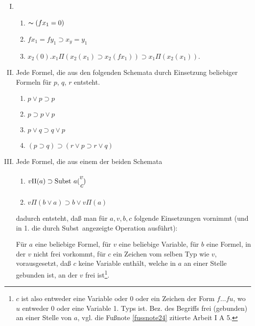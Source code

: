 \documentclass[draft]{scrartcl}
\begin{document}
\begin{enumerate}[I.]
	\item \begin{enumerate}[1.]
		\item $\thicksim\left(fx_1 = 0\right)$
		\item $fx_1 = fy_1 \supset x_y = y_1$
		\item $x_2\left(0\right).x_1\Pi\left(x_2\left(x_1\right) \supset x_2\left(fx_1\right)\right) \supset x_1 \Pi \left(x_2\left(x_1\right)\right)$.
	\end{enumerate}
	\item Jede Formel, die aus den folgenden Schemata
	durch Einsetzung beliebiger Formeln für $p$, $q$,
	$r$ entsteht.
	\begin{enumerate}[1.]
		\item $p\lor p\supset p$
		\item $p \supset p \lor p$
		\item $p \lor q \supset q \lor p$
		\item $\left(p \supset q\right) \supset \left(r \lor p \supset r \lor q\right)$
	\end{enumerate}

	\item Jede Formel, die aus einem der beiden Schemata

	\begin{enumerate}[1.]
		\item $v\Pi\left(a\right) \supset \text{Subst\ } a \Spvek{v; c}$
		\item $v\Pi\left(b \lor a\right)\supset b \lor v \Pi\left(a\right)$
	\end{enumerate}
	dadurch entsteht, daß man für $a, v, b, c$ folgende
	Einsetzungen vornimmt (und in 1. die durch \glqq Subst\grqq\ angezeigte Operation ausführt):

	Für $a$ eine beliebige Formel, für $v$ eine beliebige Variable, für $b$ eine Formel, 
	in der $v$ nicht frei vorkommt, für $c$ ein Zeichen vom selben Typ wie $v$, 
	vorausgesetzt, daß $c$ keine Variable enthält, welche in $a$ an einer Stelle
	gebunden ist, an der $v$ frei ist\footnote{$c$ ist also entweder eine Variable 
	oder 0 oder ein Zeichen der Form $f \dots fu$, wo $u$ entweder 0 oder eine 
	Variable 1. Typs ist. Bez. des Begriffs \glqq frei (gebunden) an einer Stelle 
	von $a$\grqq, vgl. die Fußnote \ref{fussnote24} zitierte Arbeit I A 5.}.


\end{enumerate}
\end{document}
